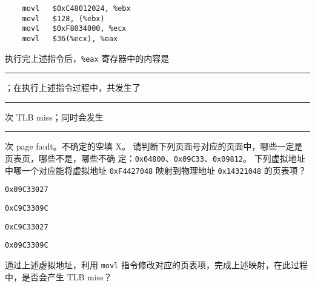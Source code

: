 \begin{problems}
\begin{verbatim}
    movl   $0xC48012024, %ebx
    movl   $128, (%ebx)
    movl   $0xF8034000, %ecx
    movl   $36(%ecx), %eax
        \end{verbatim}
        执行完上述指令后，\verb|%eax| 寄存器中的内容是 \rule{2.5cm}{0.25mm}；在执行上述指令过程中，共发生了 \rule{2.5cm}{0.25mm} 次 TLB miss；同时会发生 \rule{2.5cm}{0.25mm} 次 page fault。不确定的空填 X。
        \qn 请判断下列页面号对应的页面中，哪些一定是页表页，哪些不是，哪些不确
        定：\verb|0x04800|、\verb|0x09C33|、\verb|0x09812|。
        \qn 下列虚拟地址中哪一个对应能将虚拟地址 \verb|0xF4427048| 映射到物理地址 \verb|0x14321048| 的页表项？
        \begin{choices}
            \item \verb|0x09C33027|
            \item \verb|0xC9C3309C|
            \item \verb|0xC9C33027|
            \item \verb|0x09C3309C|
        \end{choices}
        通过上述虚拟地址，利用 \verb|movl| 指令修改对应的页表项，完成上述映射，在此过程中，是否会产生 TLB miss？


\end{problems}
